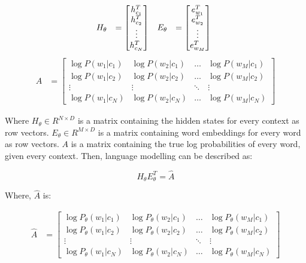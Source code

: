 \begin{displaymath}
    \begin{matrix}
        H_\theta &= \begin{bmatrix}
               h^T_{c_1} \\
               h^T_{c_2} \\
               \vdots \\
               h^T_{c_N}
              \end{bmatrix}
        &     
        E_\theta &= \begin{bmatrix}
           e^T_{w_1} \\
           e^T_{w_2} \\
           \vdots \\
           e^T_{w_M}
          \end{bmatrix}
    \end{matrix} \\
\end{displaymath}
\begin{displaymath}
    \begin{matrix}
    A &= \begin{bmatrix}
       \log P(w_1 | c_1) & \log P(w_2 | c_1) & \hdots & \log P(w_M | c_1)  \\
       \log P(w_1 | c_2) & \log P(w_2 | c_2) & \hdots & \log P(w_M | c_2) \\
       \vdots & \vdots & \ddots & \vdots \\
       \log P(w_1 | c_N) & \log P(w_2 | c_N) & \hdots & \log P(w_M | c_N)
      \end{bmatrix}
    \end{matrix}
\end{displaymath}

Where $ H_\theta \in R^{N \times D} $ is a matrix containing the hidden states for every context as row vectors. $ E_\theta \in R^{M \times D}$ is a matrix containing word embeddings for every word as row vectors. $ A $ is a matrix containing the true log probabilities of every word, given every context. Then, language modelling can be described as:

\begin{displaymath}
    H_\theta E^T_\theta = \hat A
\end{displaymath}

Where, $ \hat A $ is:

\begin{displaymath}
    \begin{matrix}
    \hat A &= \begin{bmatrix}
       \log P_\theta(w_1 | c_1) & \log P_\theta(w_2 | c_1) & \hdots & \log P_\theta(w_M | c_1)  \\
       \log P_\theta(w_1 | c_2) & \log P_\theta(w_2 | c_2) & \hdots & \log P_\theta(w_M | c_2) \\
       \vdots & \vdots & \ddots & \vdots \\
       \log P_\theta(w_1 | c_N) & \log P_\theta(w_2 | c_N) & \hdots & \log P_\theta(w_M | c_N)
      \end{bmatrix}
    \end{matrix}
\end{displaymath}

